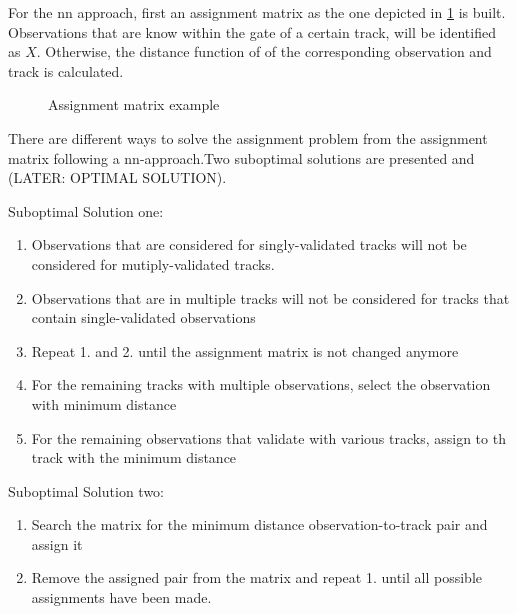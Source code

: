For the \ac{nn} approach, first an assignment matrix as the one depicted in \cref{fig:assignM} is built. Observations that are know within the gate of a certain track, will be identified as $X$. Otherwise, the distance function of of the corresponding observation and track is calculated. 

\begin{figure}[h]
	\centering
	
	\caption{Assignment matrix example}
	\label{fig:assignM}
\end{figure} 

There are different ways to solve the assignment problem from the assignment matrix following a \ac{nn}-approach.Two suboptimal solutions are presented and (LATER: OPTIMAL SOLUTION).

Suboptimal Solution one:
\begin{enumerate}
	\item Observations that are considered for singly-validated tracks will not be considered for mutiply-validated tracks. 
	\item Observations that are in multiple tracks will not be considered for tracks that contain single-validated observations
	\item Repeat 1. and 2. until the assignment matrix is not changed anymore 
	\item For the remaining tracks with multiple observations, select the observation with minimum distance 
	\item For the remaining observations that validate with various tracks, assign to th track with the minimum distance
\end{enumerate}

Suboptimal Solution two:
\begin{enumerate}
    \item Search the matrix for the minimum distance observation-to-track pair and assign it
    \item  Remove the assigned pair from the matrix and repeat 1. until all possible assignments have been made. 
\end{enumerate}